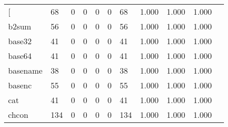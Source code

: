 \begin{longtable}{lp{1.10cm}p{1.10cm}p{1.10cm}p{1.10cm}p{1.10cm}p{1.10cm}p{1.10cm}p{1.10cm}p{1.10cm}p{1.10cm}}
\bottomrule
\endlastfoot
{[}         &                     68 &                                  0 &                                 0 &                                0 &                                 0 &                              68 &                          1.000 &                                 1.000 &                               1.000 \\
b2sum     &                     56 &                                  0 &                                 0 &                                0 &                                 0 &                              56 &                          1.000 &                                 1.000 &                               1.000 \\
base32    &                     41 &                                  0 &                                 0 &                                0 &                                 0 &                              41 &                          1.000 &                                 1.000 &                               1.000 \\
base64    &                     41 &                                  0 &                                 0 &                                0 &                                 0 &                              41 &                          1.000 &                                 1.000 &                               1.000 \\
basename  &                     38 &                                  0 &                                 0 &                                0 &                                 0 &                              38 &                          1.000 &                                 1.000 &                               1.000 \\
basenc    &                     55 &                                  0 &                                 0 &                                0 &                                 0 &                              55 &                          1.000 &                                 1.000 &                               1.000 \\
cat       &                     41 &                                  0 &                                 0 &                                0 &                                 0 &                              41 &                          1.000 &                                 1.000 &                               1.000 \\
chcon     &                    134 &                                  0 &                                 0 &                                0 &                                 0 &                             134 &                          1.000 &                                 1.000 &                               1.000 \\

\end{longtable}
